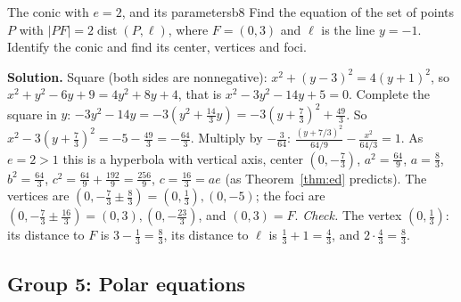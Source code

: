 \documentclass[11pt]{article}
\begin{document}
\begin{exmp}{The conic with $e=2$, and its parameters}{b8}
Find the equation of the set of points $P$ with $\lvert PF\rvert=2\operatorname{dist}(P,\ell)$, where $F=(0,3)$ and $\ell$ is the line $y=-1$. Identify the conic and find its center, vertices and foci.

\textbf{Solution.} Square (both sides are nonnegative): $x^2+(y-3)^2=4(y+1)^2$, so $x^2+y^2-6y+9=4y^2+8y+4$, that is $x^2-3y^2-14y+5=0$. Complete the square in $y$: $-3y^2-14y=-3\left(y^2+\frac{14}3y\right)=-3\left(y+\frac73\right)^2+\frac{49}3$. So $x^2-3\left(y+\frac73\right)^2=-5-\frac{49}3=-\frac{64}3$. Multiply by $-\frac3{64}$: $\frac{\left(y+7/3\right)^2}{64/9}-\frac{x^2}{64/3}=1$. As $e=2>1$ this is a hyperbola with vertical axis, center $\left(0,-\frac73\right)$, $a^2=\frac{64}9$, $a=\frac83$, $b^2=\frac{64}3$, $c^2=\frac{64}9+\frac{192}9=\frac{256}9$, $c=\frac{16}3=ae$ (as Theorem~\ref{thm:ed} predicts). The vertices are $\left(0,-\frac73\pm\frac83\right)=\left(0,\frac13\right),(0,-5)$; the foci are $\left(0,-\frac73\pm\frac{16}3\right)=(0,3),\left(0,-\frac{23}3\right)$, and $(0,3)=F$.
\emph{Check.} The vertex $\left(0,\frac13\right)$: its distance to $F$ is $3-\frac13=\frac83$, its distance to $\ell$ is $\frac13+1=\frac43$, and $2\cdot\frac43=\frac83$.
\end{exmp}

\subsection*{Group 5: Polar equations}
\end{document}
